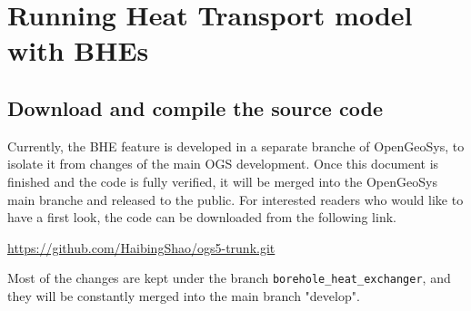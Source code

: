 \chapter{Running Heat Transport model with BHEs}

\section{Download and compile the source code}
Currently, the BHE feature is developed in a separate branche of OpenGeoSys, to isolate it from changes of the main OGS development. Once this document is finished and the code is fully verified, it will be merged into the OpenGeoSys main branche and released to the public. For interested readers who would like to have a first look, the code can be downloaded from the following link. 
\par
\url{https://github.com/HaibingShao/ogs5-trunk.git}
\par
Most of the changes are kept under the branch \texttt{borehole\_heat\_exchanger}, and they will be constantly merged into the main branch "develop". 

